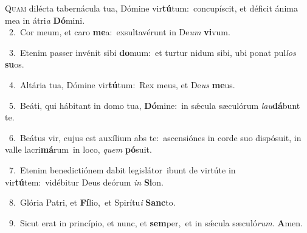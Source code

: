 \lettrine{\initial\textcolor{\initialcolor}{Q}}{uam} dilécta tabernácula tua, Dómine vir\-\textbf{tú}\-tum:~\star concupíscit, et déficit ánima mea in átri\textit{a} \textbf{Dó}\-mini.\\
{\numbfont\textcolor{\numbcolor}{~2.}}~Cor meum, et caro \textbf{me}\-a:~\star exsultavérunt in De\textit{um} \textbf{vi}\-vum.\par
{\numbfont\textcolor{\numbcolor}{~3.}}~Etenim passer invénit sibi \textbf{do}\-mum:~\star et turtur nidum sibi, ubi ponat pul\textit{los} \textbf{su}\-os.\par
{\numbfont\textcolor{\numbcolor}{~4.}}~Altária tua, Dómine vir\-\textbf{tú}\-tum:~\star Rex meus, et De\textit{us} \textbf{me}\-us.\par
{\numbfont\textcolor{\numbcolor}{~5.}}~Beáti, qui hábitant in domo tua, \textbf{Dó}\-mine:~\star in sǽcula sæculórum \textit{lau}\-\textbf{dá}bunt te.\par
{\numbfont\textcolor{\numbcolor}{~6.}}~Beátus vir, cujus est auxílium abs te:~\dagger ascensiónes in corde suo dispósuit, in valle lacri\-\textbf{má}\-rum~\star in loco, \textit{quem} \textbf{pó}\-suit.\par
{\numbfont\textcolor{\numbcolor}{~7.}}~Etenim benedictiónem dabit legislátor~\dagger ibunt de virtúte in vir\-\textbf{tú}\-tem:~\star vidébitur Deus deórum \textit{in} \textbf{Si}\-on.\par
{\numbfont\textcolor{\numbcolor}{~8.}}~Glória Patri, et \textbf{Fí}\-lio,~\star et Spirítu\textit{i} \textbf{Sanc}\-to.\par
{\numbfont\textcolor{\numbcolor}{~9.}}~Sicut erat in princípio, et nunc, et \textbf{sem}\-per,~\star et in sǽcula sæculó\-\textit{rum}\-. \textbf{A}\-men.\par
